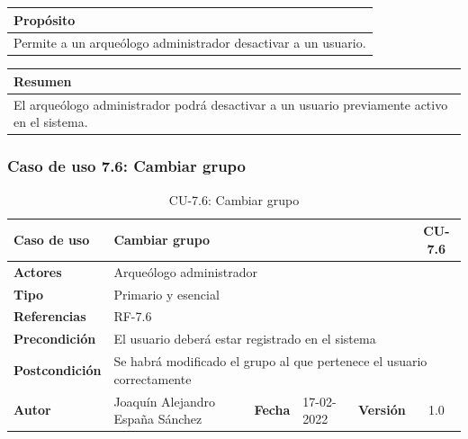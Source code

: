     \begin{table}[H]
        \centering
        \begin{tabularx}{\textwidth}{@{} |L |@{}} \hline
            \textbf{Propósito} \\
            \hline
            Permite a un arqueólogo administrador desactivar a un usuario. \\
            \hline
        \end{tabularx}
    \end{table}

    \begin{table}[H]
        \centering
        \begin{tabularx}{\textwidth}{@{} |L |@{}} \hline
            \textbf{Resumen} \\
            \hline
            El arqueólogo administrador podrá desactivar a un usuario previamente activo en el
            sistema. \\
            \hline
        \end{tabularx}
    \end{table}


\subsubsection{Caso de uso 7.6: Cambiar grupo}

\begin{table}[H]
    \begin{center}
        \begin{adjustbox}{width=\textwidth}
        \begin{tabular}{ | l | l | l | l | c | c | } 
            \hline
            \textbf{Caso de uso} & \multicolumn{4}{l|}{Cambiar grupo} & \cellcolor{gray!50} \textbf{CU-7.6}\\
            \hline
            \textbf{Actores} & \multicolumn{5}{p{0.9\linewidth}|}{Arqueólogo administrador} \\
            \hline
            \textbf{Tipo} & \multicolumn{5}{l|}{Primario y esencial} \\
            \hline
            \textbf{Referencias} & \multicolumn{3}{l|}{RF-7.6} & \multicolumn{2}{l|}{ }\\
            \hline
            \textbf{Precondición} & \multicolumn{5}{l|}{El usuario deberá estar registrado en el sistema} \\
            \hline
            \textbf{Postcondición} & \multicolumn{5}{l|}{Se habrá modificado el grupo al que pertenece el usuario correctamente} \\
            \hline
            \textbf{Autor} & \multicolumn{1}{p{0.25\linewidth}|}{Joaquín Alejandro España Sánchez} & \textbf{Fecha} & 
            17-02-2022     & \textbf{Versión}                                                      & 1.0\\
            \hline
        \end{tabular}
        \end{adjustbox}
        \caption{CU-7.6: Cambiar grupo}
        \label{tab:change-group}
    \end{center}
    \end{table}

